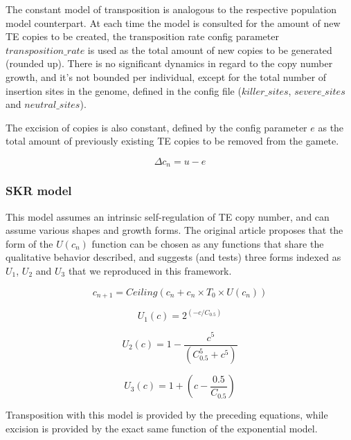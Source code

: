 \documentclass[10pt]{article}
\begin{document}
The constant model of transposition is analogous to the respective
population model counterpart. At each time the model is consulted for
the amount of new TE copies to be created, the transposition rate
config parameter $transposition\_rate$ is used as the total amount of
new copies to be generated (rounded up). There is no significant
dynamics in regard to the copy number growth, and it's not bounded per
individual, except for the total number of insertion sites in the
genome, defined in the config file ($killer\_sites$, $severe\_sites$
and $neutral\_sites$). 

The excision of copies is also constant, defined by the config
parameter $e$ as the total amount of previously existing TE copies to
be removed from the gamete.

\begin{equation}
  \Delta c_n = u - e
\end{equation}


\subsubsection{SKR model}

This model assumes an intrinsic self-regulation of TE copy number, and
can assume various shapes and growth forms. The original article
proposes that the form of the $U(c_n)$ function can be chosen as any
functions that share the qualitative behavior described, and suggests
(and tests) three forms indexed as $U_1$, $U_2$ and $U_3$ that we
reproduced in this framework.

\begin{equation}
  c_{n+1} = Ceiling(c_n + c_n \times T_0 \times U (c_n ))
\end{equation}

\begin{equation}
  U_1(c) = 2^{(-c/C_{0.5})}
\end{equation}

\begin{equation}
  U_2 (c) = 1 - \frac{c^5} {(C_{0.5}^5 + c^5 )}
\end{equation}

\begin{equation}
  U_3 (c) = 1 + (c - \frac{0.5}{C_{0.5}} )
\end{equation}

Transposition with this model is provided by the preceding equations,
while excision is provided by the exact same function of the
exponential model.
\end{document}

